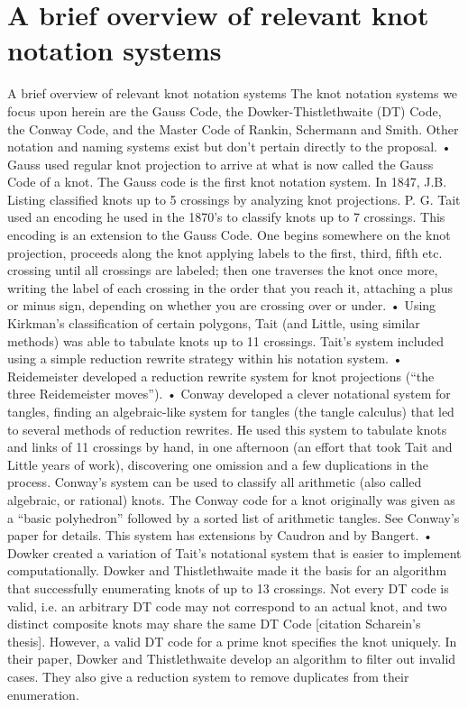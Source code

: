 \documentclass[12pt]{amsart}
\begin{document}
\section{A brief overview of relevant knot notation systems}\label{sec:notation} %
A brief overview of relevant knot notation systems
The knot notation systems we focus upon herein are the Gauss Code, the Dowker-Thistlethwaite (DT) Code, the Conway Code, and the Master Code of Rankin, Schermann and Smith. Other notation and naming systems exist but don’t pertain directly to the proposal.
• Gauss used regular knot projection to arrive at what is now called the Gauss Code of a knot. The Gauss code is the first knot notation system. In 1847, J.B. Listing classified knots up to 5 crossings by analyzing knot projections. P. G. Tait used an encoding he used in the 1870’s to classify knots up to 7 crossings. This encoding is an extension to the Gauss Code. One begins somewhere on the knot projection, proceeds along the knot applying labels to the first, third, fifth etc. crossing until all crossings are labeled; then one traverses the knot once more, writing the label of each crossing in the order that you reach it, attaching a plus or minus sign, depending on whether you are crossing over or under. 
• Using Kirkman’s classification of certain polygons, Tait (and Little, using similar methods) was able to tabulate knots up to 11 crossings. Tait’s system included using a simple reduction rewrite strategy within his notation system. 
• Reidemeister developed a reduction rewrite system for knot projections (“the three Reidemeister moves”).
• Conway developed a clever notational system for tangles, finding an algebraic-like system for tangles (the tangle calculus) that led to several methods of reduction rewrites. He used this system to tabulate knots and links of 11 crossings by hand, in one afternoon (an effort that took Tait and Little years of work), discovering one omission and a few duplications in the process. Conway’s system can be used to classify all arithmetic (also called algebraic, or rational) knots. The Conway code for a knot originally was given as a “basic polyhedron” followed by a sorted list of arithmetic tangles. See Conway’s paper for details. This system has extensions by Caudron and by Bangert.
• Dowker created a variation of Tait’s notational system that is easier to implement computationally. Dowker and Thistlethwaite made it the basis for an algorithm that successfully enumerating knots of up to 13 crossings. Not every DT code is valid, i.e. an arbitrary DT code may not correspond to an actual knot, and two distinct composite knots may share the same DT Code [citation Scharein’s thesis]. However, a valid DT code for a prime knot specifies the knot uniquely. In their paper, Dowker and Thistlethwaite develop an algorithm to filter out invalid cases. They also give a reduction system to remove duplicates from their enumeration.
\end{document}
